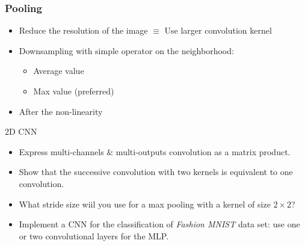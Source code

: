 \documentclass[pressentation,10pt,aspectratio=169,xcolor=table, colorlinks=true]{beamer}
\begin{document}
\begin{frame}
  \frametitle{Pooling}
  \begin{itemize}
  \item Reduce the resolution of the image \(\equiv\) Use larger convolution kernel
  \item Downsampling with simple operator on the neighborhood:
    \begin{itemize}
    \item Average value
    \item Max value (preferred)
    \end{itemize}
  \item After the non-linearity
  \end{itemize}
  \begin{center}
    \end{center}
  \end{frame}

  \begin{frame}{2D CNN}
    \begin{work}
      \begin{itemize}
      \item Express multi-channels \& multi-outputs convolution as a matrix product.
      \item Show that the successive convolution with two kernels is equivalent to one convolution.
      \item What stride size wiil you use for a max pooling with a kernel of size \(2 \times 2\)?
      \item Implement a CNN for the classification of \emph{Fashion MNIST} data set: use one or two convolutional layers for the MLP.
      \end{itemize}
    \end{work}    
  \end{frame}
\end{document}
